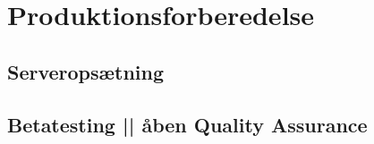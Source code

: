 \section{Produktionsforberedelse \label{sec:produktionsforberedelse}}
\subsection{Serveropsætning}
\subsection{Betatesting || åben Quality Assurance}
